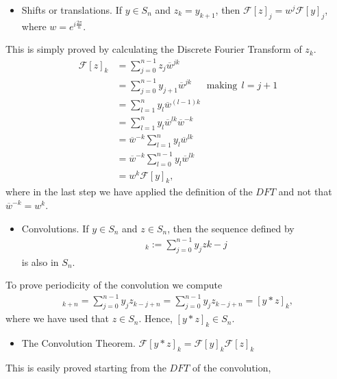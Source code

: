 \begin{questions}

\begin{itemize}
\item Shifts or translations. If $y\in S_n$ and $z_k=y_{k+1}$, then $\mathcal{F}[z]_j=w^j\mathcal{F}[y]_j$, where $w=e^{i\frac{2\pi}{n}}$.
\end{itemize}
\begin{solution}
This is simply proved by calculating the Discrete Fourier Transform of $z_k$.
\begin{align*}
\mathcal{F}[z]_k&=\sum_{j=0}^{n-1}z_j\overline{w}^{jk}\\
&=\sum_{j=0}^{n-1}y_{j+1}\overline{w}^{jk}~~~~~~~\text{making}~~l=j+1\\
&=\sum_{l=1}^{n}y_{l}\overline{w}^{(l-1)k}\\
&=\sum_{l=1}^{n}y_{l}\overline{w}^{lk}\overline{w}^{-k}\\
&=\overline{w}^{-k}\sum_{l=1}^{n}y_{l}\overline{w}^{lk}\\
&=\overline{w}^{-k}\sum_{l=0}^{n-1}y_{l}\overline{w}^{lk}\\
&=w^k\mathcal{F}[y]_k,
\end{align*}
where in the last step we have applied the definition of the $DFT$ and not that $\overline{w}^{-k}=w^k$.
\end{solution}
\begin{itemize}
\item Convolutions. If $y\in S_n$ and $z\in S_n$, then the sequence defined by
\begin{align*}
[y*z]_k:=\sum_{j=0}^{n-1}y_jz{k-j}
\end{align*}
is also in $S_n$.
\end{itemize}
\begin{solution}
To prove periodicity of the convolution we compute
\begin{align*}
[y*z]_{k+n}=\sum_{j=0}^{n-1}y_jz_{k-j+n}=\sum_{j=0}^{n-1}y_jz_{k-j+n}=[y*z]_{k},
\end{align*}
where we have used that $z\in S_n$. Hence, $[y*z]_k\in S_n$.
\end{solution}
\begin{itemize}
\item The Convolution Theorem. $\mathcal{F}[y*z]_k=\mathcal{F}[y]_k\mathcal{F}[z]_k$
\end{itemize}
\begin{solution}
This is easily proved starting from the $DFT$ of the convolution,

\end{solution}
\end{questions}
